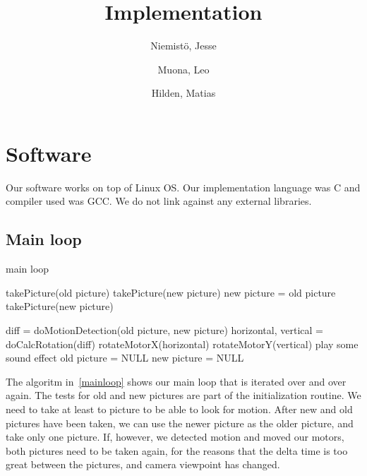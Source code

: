 \documentclass[english,11pt,twoside,a4paper]{article}
\begin{document}
\author{
  Niemistö, Jesse
  \and
  Muona, Leo
  \and
  Hilden, Matias
}
\title{Implementation}

\maketitle

\section{Software}

Our software works on top of Linux OS. Our implementation language was C and compiler used was GCC. We do not link against any external libraries. 

\subsection{Main loop}

\begin{algorithm}
  \label{mainloop}
  \caption{main loop}
  \begin{algorithmic}
      \STATE takePicture(old picture)
      \STATE takePicture(new picture)
    \ELSE
      \STATE new picture = old picture
      \STATE takePicture(new picture)
    \ENDIF

      \STATE diff = doMotionDetection(old picture, new picture)
        \STATE horizontal, vertical = doCalcRotation(diff)
        \STATE rotateMotorX(horizontal)
        \STATE rotateMotorY(vertical)
          \STATE play some sound effect
        \ENDIF
	\STATE old picture = NULL
	\STATE new picture = NULL
      \ENDIF
    \ENDIF
  \end{algorithmic}
\end{algorithm}

The algoritm in~\ref{mainloop} shows our main loop that is iterated over and over again. The tests for old and new pictures are part of the initialization routine. We need to take at least to picture to be able to look for motion. After new and old pictures have been taken, we can use the newer picture as the older picture, and take only one picture. If, however, we detected motion and moved our motors, both pictures need to be taken again, for the reasons that the delta time is too great between the pictures, and camera viewpoint has changed.
\end{document}
